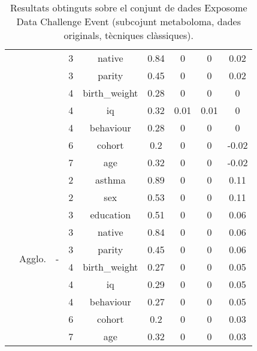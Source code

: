\documentclass[CAT,BIB]{TFUOC}%
\begin{document}
\begin{table}
\begin{tabular}{@{}ccccccccc@{}}
            &  &  & 3 & native & 0.84 & 0 & 0 & 0.02 \\
            &  &  & 3 & parity & 0.45 & 0 & 0 & 0.02 \\
            &  &  & 4 & birth\_weight & 0.28 & 0 & 0 & 0 \\
            &  &  & 4 & iq & 0.32 & 0.01 & 0.01 & 0 \\
            &  &  & 4 & behaviour & 0.28 & 0 & 0 & 0 \\
            &  &  & 6 & cohort & 0.2 & 0 & 0 & -0.02 \\
            &  &  & 7 & age & 0.32 & 0 & 0 & -0.02 \\ \cmidrule(l){2-9}
            & \multirow{10}{*}{Agglo.} & \multirow{10}{*}{-} & 2 & asthma & 0.89 & 0 & 0 & 0.11 \\
            &  &  & 2 & sex & 0.53 & 0 & 0 & 0.11 \\
            &  &  & 3 & education & 0.51 & 0 & 0 & 0.06 \\
            &  &  & 3 & native & 0.84 & 0 & 0 & 0.06 \\
            &  &  & 3 & parity & 0.45 & 0 & 0 & 0.06 \\
            &  &  & 4 & birth\_weight & 0.27 & 0 & 0 & 0.05 \\
            &  &  & 4 & iq & 0.29 & 0 & 0 & 0.05 \\
            &  &  & 4 & behaviour & 0.27 & 0 & 0 & 0.05 \\
            &  &  & 6 & cohort & 0.2 & 0 & 0 & 0.03 \\
            &  &  & 7 & age & 0.32 & 0 & 0 & 0.03 \\ \bottomrule
        \end{tabular}
        \caption[Exposome Data Challenge Event: resultats - part 1]{
            Resultats obtinguts sobre el conjunt de dades Exposome Data Challenge Event
            (subcojunt metaboloma, dades originals, tècniques clàssiques).
        }
        \label{t:results_exposome1}
    \end{table}
\end{document}
